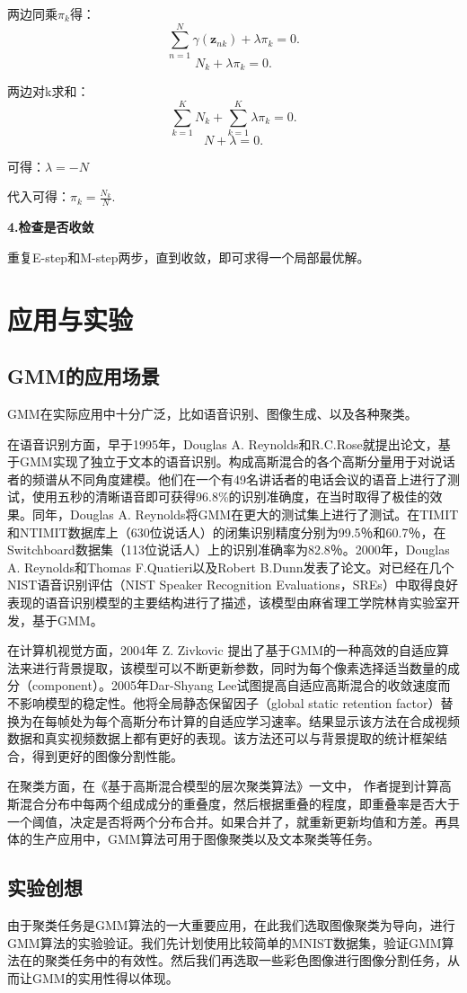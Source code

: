 \documentclass[UTF8]{ctexart}
\begin{document}
两边同乘$\pi_k$得：
\begin{equation}
  \sum_{n=1}^N\gamma (\mathbf z_{nk}) + \lambda\pi_k=0.
\end{equation}
\begin{equation}
  N_k+\lambda\pi_k=0.
\end{equation}

两边对k求和：
\begin{equation}
  \sum_{k=1}^KN_k+\sum_{k=1}^K\lambda\pi_k=0.
\end{equation}
\begin{equation}
  N+\lambda=0.
\end{equation}

可得：$\lambda=-N$
 
代入可得：$\pi_k=\frac{N_k}{N}.$

\textbf{4.检查是否收敛}

重复E-step和M-step两步，直到收敛，即可求得一个局部最优解。




\section{应用与实验}

\subsection{GMM的应用场景}

GMM在实际应用中十分广泛，比如语音识别、图像生成、以及各种聚类。

在语音识别方面，早于1995年，Douglas A. Reynolds和R.C.Rose就提出论文，基于GMM实现了独立于文本的语音识别。构成高斯混合的各个高斯分量用于对说话者的频谱从不同角度建模。他们在一个有49名讲话者的电话会议的语音上进行了测试，使用五秒的清晰语音即可获得96.8\%的识别准确度，在当时取得了极佳的效果。同年，Douglas A. Reynolds将GMM在更大的测试集上进行了测试。在TIMIT和NTIMIT数据库上（630位说话人）的闭集识别精度分别为99.5％和60.7％，在Switchboard数据集（113位说话人）上的识别准确率为82.8％。2000年，Douglas A. Reynolds和Thomas F.Quatieri以及Robert B.Dunn发表了论文。对已经在几个NIST语音识别评估（NIST Speaker Recognition Evaluations，SREs）中取得良好表现的语音识别模型的主要结构进行了描述，该模型由麻省理工学院林肯实验室开发，基于GMM。

在计算机视觉方面，2004年 Z. Zivkovic 提出了基于GMM的一种高效的自适应算法来进行背景提取，该模型可以不断更新参数，同时为每个像素选择适当数量的成分（component）。2005年Dar-Shyang Lee试图提高自适应高斯混合的收敛速度而不影响模型的稳定性。他将全局静态保留因子（global static retention factor）替换为在每帧处为每个高斯分布计算的自适应学习速率。结果显示该方法在合成视频数据和真实视频数据上都有更好的表现。该方法还可以与背景提取的统计框架结合，得到更好的图像分割性能。

在聚类方面，在《基于高斯混合模型的层次聚类算法》一文中， 作者提到计算高斯混合分布中每两个组成成分的重叠度，然后根据重叠的程度，即重叠率是否大于一个阈值，决定是否将两个分布合并。如果合并了，就重新更新均值和方差。再具体的生产应用中，GMM算法可用于图像聚类以及文本聚类等任务。

\subsection{实验创想}
由于聚类任务是GMM算法的一大重要应用，在此我们选取图像聚类为导向，进行GMM算法的实验验证。我们先计划使用比较简单的MNIST数据集，验证GMM算法在的聚类任务中的有效性。然后我们再选取一些彩色图像进行图像分割任务，从而让GMM的实用性得以体现。
\end{document}
